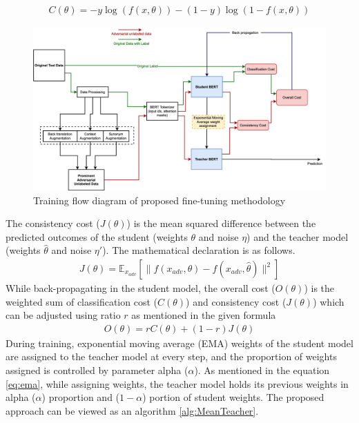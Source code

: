 \documentclass[%
	BCOR=8mm, %
	DIV=12,
	toc=bibliography, %
	toc=listof, %
	oneside, %
	egregdoesnotlikesansseriftitles, %
	]{scrbook}
\begin{document}
\begin{equation}
    \begin{aligned}
        C( \theta )=-y \log (f(x,\theta))-(1-y) \log(1-f(x,\theta))
        \label{eq:classification_cost}
    \end{aligned}
\end{equation}
 \begin{figure}[h!]
    \centering
    \includegraphics[width=1.1\textwidth]{img/Methodology.png}
    \caption[Training flow diagram of proposed fine-tuning approach]{Training flow diagram of proposed fine-tuning methodology }
    \label{diag:advMTBERT}
\end{figure}
The consistency cost ($J(\theta)$)  is the mean squared difference between the predicted outcomes of the student (weights $\theta$ and noise $\eta$) and the teacher model (weights $\hat\theta$ and noise $\eta'$).  The mathematical declaration is as follows. 
\begin{equation}
    \begin{aligned}
        J( \theta )=\mathbb{E}_{x_{adv}}[\|f(x_{adv},\theta)-f(x_{adv},\hat\theta)\|^2]
        \label{eq:ADVconsistencycost}
    \end{aligned}
\end{equation}
While back-propagating in the student model, the overall cost ($\textit{O}(\theta)$) is the weighted sum of classification cost ($C(\theta)$)  and consistency cost ($J(\theta)$) which can be adjusted using ratio $r$ as mentioned in the given formula 
 \begin{equation}
     \begin{aligned}
         \textit{O}(\theta)= r C(\theta)+(1-r)J(\theta)
         \label{eq:overallcost}
         \end{aligned}
   \end{equation}
   During training, exponential moving average (EMA) weights of the student model are assigned to the teacher model at every step, and the proportion of weights assigned is controlled by parameter alpha ($\alpha$). As mentioned in the equation \ref{eq:ema}, while assigning weights, the teacher model holds its previous weights in alpha ($\alpha$) proportion and ($1-\alpha$) portion of student weights. The proposed approach can be viewed as an algorithm \ref{alg:MeanTeacher}.
\end{document}
